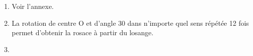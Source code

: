 \begin{enumerate}
\item %
Voir l'annexe. 
\item %


%

La rotation de centre O et d'angle 30\degres{} dans n'importe quel sens  répétée 12 fois permet d'obtenir la rosace à partir du losange. 
\item %



\end{enumerate}

